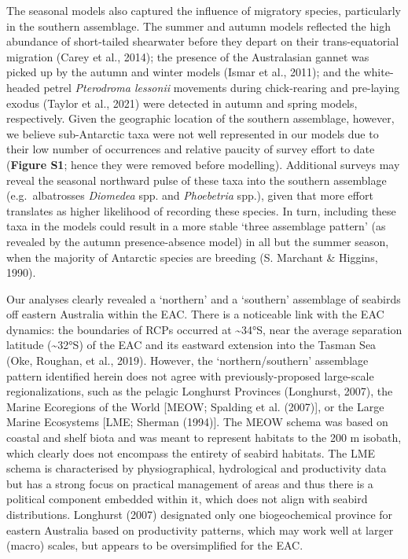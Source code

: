 \documentclass{article}
\begin{document}
\begin{linenumbers}
The seasonal models also captured the influence of migratory species, particularly in the southern assemblage. The summer and autumn models reflected the high abundance of short-tailed shearwater before they depart on their trans-equatorial migration (Carey et al., 2014); the presence of the Australasian gannet was picked up by the autumn and winter models (Ismar et al., 2011); and the white-headed petrel \emph{Pterodroma lessonii} movements during chick-rearing and pre-laying exodus (Taylor et al., 2021) were detected in autumn and spring models, respectively. Given the geographic location of the southern assemblage, however, we believe sub-Antarctic taxa were not well represented in our models due to their low number of occurrences and relative paucity of survey effort to date (\textbf{Figure S1}; hence they were removed before modelling). Additional surveys may reveal the seasonal northward pulse of these taxa into the southern assemblage (e.g.~albatrosses \emph{Diomedea} spp. and \emph{Phoebetria} spp.), given that more effort translates as higher likelihood of recording these species. In turn, including these taxa in the models could result in a more stable `three assemblage pattern' (as revealed by the autumn presence-absence model) in all but the summer season, when the majority of Antarctic species are breeding (S. Marchant \& Higgins, 1990).

Our analyses clearly revealed a `northern' and a `southern' assemblage of seabirds off eastern Australia within the EAC. There is a noticeable link with the EAC dynamics: the boundaries of RCPs occurred at \textasciitilde34°S, near the average separation latitude (\textasciitilde32°S) of the EAC and its eastward extension into the Tasman Sea (Oke, Roughan, et al., 2019). However, the `northern/southern' assemblage pattern identified herein does not agree with previously-proposed large-scale regionalizations, such as the pelagic Longhurst Provinces (Longhurst, 2007), the Marine Ecoregions of the World {[}MEOW; Spalding et al. (2007){]}, or the Large Marine Ecosystems {[}LME; Sherman (1994){]}. The MEOW schema was based on coastal and shelf biota and was meant to represent habitats to the 200 m isobath, which clearly does not encompass the entirety of seabird habitats. The LME schema is characterised by physiographical, hydrological and productivity data but has a strong focus on practical management of areas and thus there is a political component embedded within it, which does not align with seabird distributions. Longhurst (2007) designated only one biogeochemical province for eastern Australia based on productivity patterns, which may work well at larger (macro) scales, but appears to be oversimplified for the EAC.


\end{linenumbers}
\end{document}
